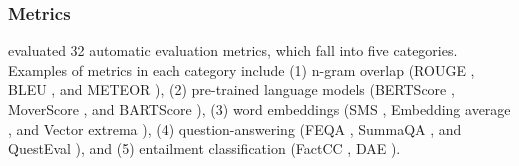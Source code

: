 \subsubsection{Metrics}
\label{metrics}
\citet{gao2022dialsummeval} evaluated 32 automatic evaluation metrics, which fall into five categories. Examples of metrics in each category include (1) n-gram overlap (ROUGE \cite{lin2004rouge}, BLEU \cite{papineni2002bleu}, and METEOR \cite{banerjee-lavie:2005:ACL}), (2) pre-trained language models (BERTScore \cite{zhang-etal-2020-bertscore}, MoverScore \cite{zhao-etal-2019-moverscore}, and BARTScore \cite{yuan-etal-2021-bartscore}), (3) word embeddings (SMS \cite{clark-etal-2019-sentence}, Embedding average \cite{landauer1997solution}, and Vector extrema \cite{forgues2014automatic}), (4) question-answering (FEQA \cite{Durmus_2020}, SummaQA \cite{Scialom_2019}, and QuestEval \cite{Scialom_2021}), and (5) entailment classification (FactCC \cite{kryscinski-etal-2020-factcc}, DAE \cite{goyal-durrett-2020-dae}).


